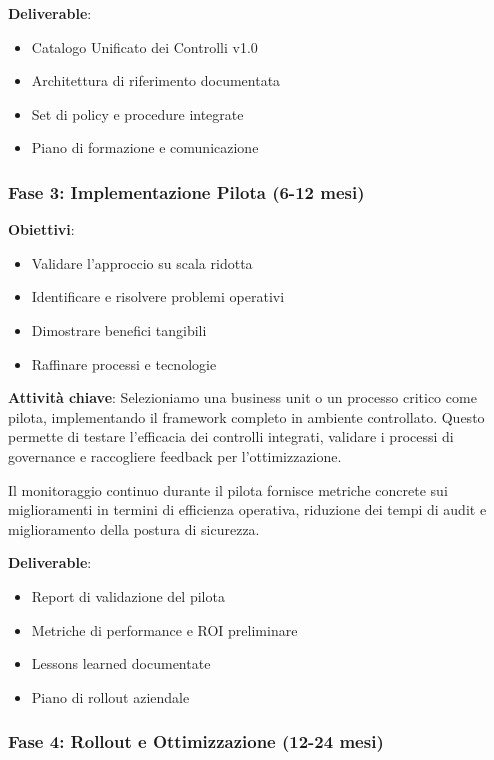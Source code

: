 \textbf{Deliverable}:
\begin{itemize}
    \item Catalogo Unificato dei Controlli v1.0
    \item Architettura di riferimento documentata
    \item Set di policy e procedure integrate
    \item Piano di formazione e comunicazione
\end{itemize}

\subsubsection{Fase 3: Implementazione Pilota (6-12 mesi)}

\textbf{Obiettivi}:
\begin{itemize}
    \item Validare l'approccio su scala ridotta
    \item Identificare e risolvere problemi operativi
    \item Dimostrare benefici tangibili
    \item Raffinare processi e tecnologie
\end{itemize}

\textbf{Attività chiave}:
Selezioniamo una business unit o un processo critico come pilota, implementando il framework completo in ambiente controllato. Questo permette di testare l'efficacia dei controlli integrati, validare i processi di governance e raccogliere feedback per l'ottimizzazione.

Il monitoraggio continuo durante il pilota fornisce metriche concrete sui miglioramenti in termini di efficienza operativa, riduzione dei tempi di audit e miglioramento della postura di sicurezza.

\textbf{Deliverable}:
\begin{itemize}
    \item Report di validazione del pilota
    \item Metriche di performance e ROI preliminare
    \item Lessons learned documentate
    \item Piano di rollout aziendale
\end{itemize}

\subsubsection{Fase 4: Rollout e Ottimizzazione (12-24 mesi)}


